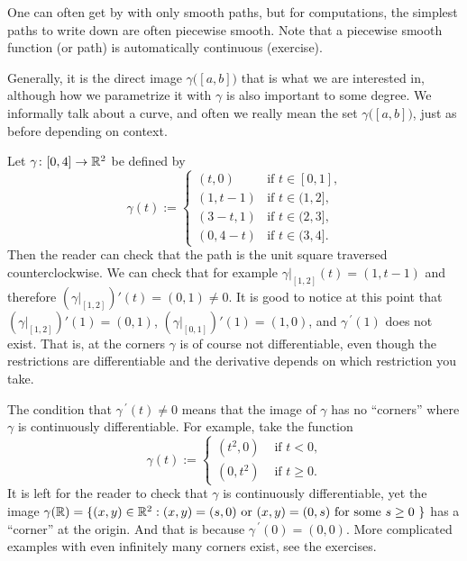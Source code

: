 One can often get by with only smooth paths, but for computations, the simplest
paths to write down are often piecewise smooth.
Note that a piecewise smooth function (or path) is automatically continuous (exercise).

Generally, it is the direct image $\gamma\bigl([a,b]\bigr)$ that is what we are
interested in, although how we parametrize it with $\gamma$ is also
important to some degree.  We informally talk about a curve, and often
we really mean the set $\gamma\bigl([a,b]\bigr)$, just as before depending
on context.

\begin{example} \label{mv:example:unitsquarepath}
Let $\gamma \colon [0,4] \to {\mathbb{R}}^2$ be defined by
\begin{equation*}
\gamma(t) :=
\begin{cases}
(t,0) & \text{if $t \in [0,1]$,}\\
(1,t-1) & \text{if $t \in (1,2]$,}\\
(3-t,1) & \text{if $t \in (2,3]$,}\\
(0,4-t) & \text{if $t \in (3,4]$.}
\end{cases}
\end{equation*}
Then the reader can check that the path is the unit square traversed
counterclockwise.  We can check that for example
$\gamma|_{[1,2]}(t) = (1,t-1)$ and therefore
$(\gamma|_{[1,2]})'(t) = (0,1) \not= 0$.  It is good to notice at this point
that
$(\gamma|_{[1,2]})'(1) = (0,1)$,
$(\gamma|_{[0,1]})'(1) = (1,0)$, and
$\gamma^{\:\prime}(1)$ does not exist.  That is, at the corners $\gamma$ is of course
not differentiable, even though the restrictions are differentiable and the
derivative depends on which restriction you take.
\end{example}

\begin{example}
The condition that $\gamma^{\:\prime}(t) \not= 0$ means that the image of $\gamma$
has no ``corners'' where $\gamma$ is continuously differentiable.  For example,
take the function
\begin{equation*}
\gamma(t) :=
\begin{cases}
(t^2,0) & \text{ if $t < 0$,}\\
(0,t^2) & \text{ if $t \geq 0$.}
\end{cases}
\end{equation*}
It is left for the reader to check that $\gamma$ is continuously
differentiable, yet the image $\gamma({\mathbb{R}}) = \{ (x,y) \in {\mathbb{R}}^2 : (x,y) =
(s,0) \text{ or } (x,y) = (0,s) \text{ for some $s \geq 0$ } \}$ has a
``corner'' at the origin.  And that is because $\gamma^{\:\prime}(0) = (0,0)$.
More complicated examples with even infinitely many corners exist,
see the exercises.
\end{example}

